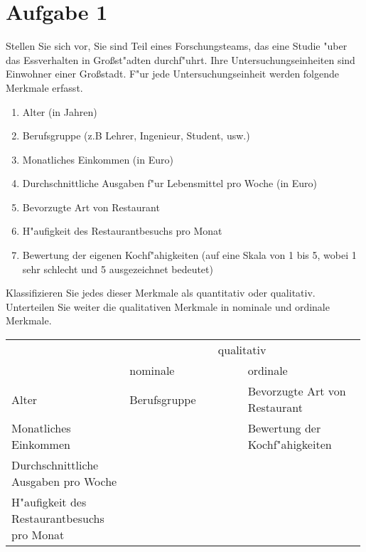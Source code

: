 \section{Aufgabe 1}

Stellen Sie sich vor, Sie sind Teil eines Forschungsteams, das eine Studie
"uber das Essverhalten in Großst"adten durchf"uhrt. Ihre Untersuchungseinheiten
sind Einwohner einer Großstadt. F"ur jede Untersuchungseinheit werden folgende
Merkmale erfasst.

\begin{enumerate}[-]
    \item Alter (in Jahren)
    \item Berufsgruppe (z.B Lehrer, Ingenieur, Student, usw.)
    \item Monatliches Einkommen (in Euro)
    \item Durchschnittliche Ausgaben f"ur Lebensmittel pro Woche (in Euro)
    \item Bevorzugte Art von Restaurant
    \item H"aufigkeit des Restaurantbesuchs pro Monat
    \item Bewertung der eigenen Kochf"ahigkeiten (auf eine Skala von 1 bis 5,
        wobei 1 sehr schlecht und 5 ausgezeichnet bedeutet)
\end{enumerate}

Klassifizieren Sie jedes dieser Merkmale als quantitativ oder qualitativ.
Unterteilen Sie weiter die qualitativen Merkmale in nominale und ordinale
Merkmale.

\bgroup
\def\arraystretch{1.5}
\begin{table}[h]
    \centering
    \begin{tabular}{p{0.33\linewidth}|p{0.33\linewidth}|p{0.33\linewidth}}
        \hfil\multirow{2}{*}{\centering quantitativ} & \multicolumn{2}{c}{qualitativ} \\
        \cline{2-3}
        & \hfil nominale & \hfil ordinale \\ \hline
        Alter & Berufsgruppe & Bevorzugte Art von Restaurant \\ \cline{1-1} \cline{3-3}
        Monatliches Einkommen & & Bewertung der Kochf"ahigkeiten \\ \cline{1-1}
        Durchschnittliche Ausgaben pro Woche & & \\ \cline{1-1}
        H"aufigkeit des Restaurantbesuchs pro Monat & &
    \end{tabular}
\end{table}
\egroup
